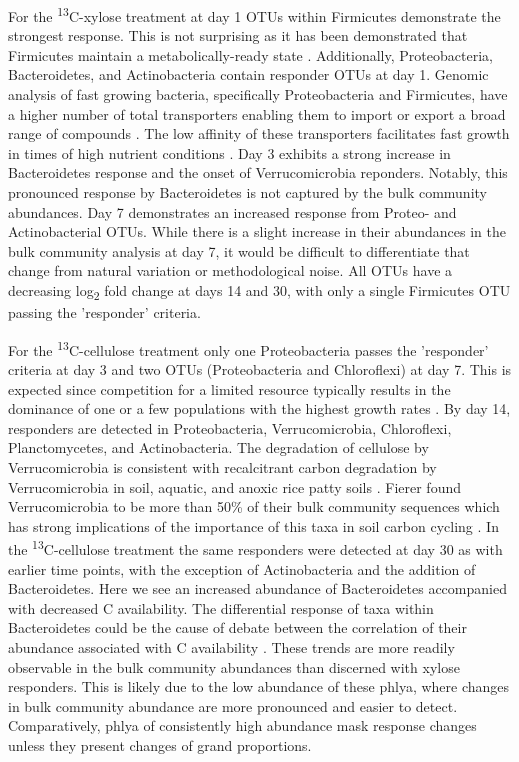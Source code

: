 For the \textsuperscript{13}C-xylose treatment at day 1 OTUs within Firmicutes demonstrate the strongest response. This is not surprising as it has been demonstrated that Firmicutes maintain a metabolically-ready state \cite{Jenkins_2010}\cite{Griffiths_1998}\cite{Brookes_1987}\cite{De_Nobili_2001}. Additionally, Proteobacteria, Bacteroidetes, and Actinobacteria contain responder OTUs at day 1. Genomic analysis of fast growing bacteria, specifically Proteobacteria and Firmicutes, have a higher number of total transporters enabling them to import or export a broad range of compounds \cite{Barabote_2005}. The low affinity of these transporters facilitates fast growth in times of high nutrient conditions \cite{Trivedi_2013}.  Day 3 exhibits a strong increase in Bacteroidetes response and the onset of Verrucomicrobia reponders. Notably, this pronounced response by Bacteroidetes is not captured by the bulk community abundances. Day 7 demonstrates an increased response from Proteo- and Actinobacterial OTUs.  While there is a slight increase in their abundances in the bulk community analysis at day 7, it would be difficult to differentiate that change from natural variation or methodological noise. All OTUs have a decreasing log\textsubscript{2} fold change at days 14 and 30, with only a single Firmicutes OTU passing the 'responder' criteria.     

For the \textsuperscript{13}C-cellulose treatment only one Proteobacteria passes the 'responder' criteria at day 3 and two OTUs (Proteobacteria and Chloroflexi) at day 7. This is expected since competition for a limited resource typically results in the dominance of one or a few populations with the highest growth rates \cite{Fontaine_2003}. By day 14, responders are detected in Proteobacteria, Verrucomicrobia, Chloroflexi, Planctomycetes, and Actinobacteria. The degradation of cellulose by Verrucomicrobia is consistent with recalcitrant carbon degradation by Verrucomicrobia in soil, aquatic, and anoxic rice patty soils  \cite{Fierer_2013}\cite{Herlemann_2013}\cite{10543821}. Fierer found Verrucomicrobia to be more than 50\% of their bulk community sequences which has strong implications of the importance of this taxa in soil carbon cycling \cite{Fierer_2013}. 
In the \textsuperscript{13}C-cellulose treatment the same responders were detected at day 30 as with earlier time points, with the exception of Actinobacteria and the addition of Bacteroidetes. Here we see an increased abundance of Bacteroidetes accompanied with decreased C availability. The differential response of taxa within Bacteroidetes could be the cause of debate between the correlation of their abundance associated with C availability \cite{Fierer_2007, Rui_2009, Sharp_2000}. These trends are more readily observable in the bulk community abundances than discerned with xylose responders. This is likely due to the low abundance of these phlya, where changes in bulk community abundance are more pronounced and easier to detect. Comparatively, phlya of consistently high abundance mask response changes unless they present changes of grand proportions.          

